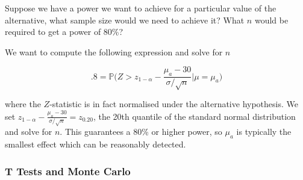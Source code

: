 \documentclass{homework}
\begin{document}
\begin{tcolorbox}[title=Example of a Sample Size Calculation]
Suppose we have a power we want to achieve for a particular value of the alternative, what sample size would we need to achieve it? What $n$ would be required to get a power of 80\%?

We want to compute the following expression and solve for $n$

$$
.8 = \mathds{P}\bigg(Z > z_{1-\alpha} -\frac{\mu_a-30}{\sigma/\sqrt{n}} \bigg|\mu = \mu_a\bigg)
$$

where the $Z$-statistic is in fact normalised under the alternative hypothesis. We set $z_{1-\alpha} -\frac{\mu_a-30}{\sigma/\sqrt{n}}  = z_{0.20}$, the 20th quantile of the standard normal distribution and solve for $n$. This guarantees a 80\% or higher power, so $\mu_a$ is typically the smallest effect which can be reasonably detected. 
\end{tcolorbox}

\subsubsection{T Tests and Monte Carlo}
\end{document}
